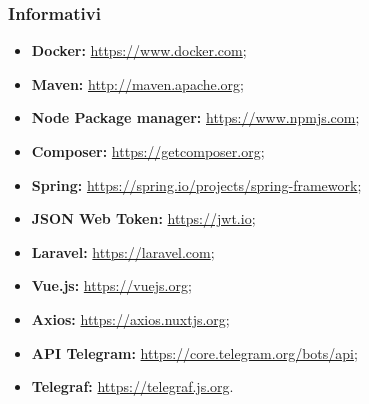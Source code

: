 		\subsubsection{Informativi}
			\begin{itemize}
				\item \textbf{Docker: }\url{https://www.docker.com};
				\item \textbf{Maven: }\url{http://maven.apache.org};
				\item \textbf{Node Package manager: }\url{https://www.npmjs.com};
				\item \textbf{Composer: }\url{https://getcomposer.org};
				\item \textbf{Spring: }\url{https://spring.io/projects/spring-framework};
				\item \textbf{JSON Web Token: }\url{https://jwt.io};
				\item \textbf{Laravel: } \url{https://laravel.com};
				\item \textbf{Vue.js: }\url{https://vuejs.org};
				\item \textbf{Axios: }\url{https://axios.nuxtjs.org};
				\item \textbf{API Telegram: }\url{https://core.telegram.org/bots/api};
				\item \textbf{Telegraf: }\url{https://telegraf.js.org}. 

			\end{itemize}